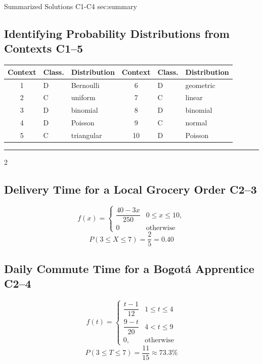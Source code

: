 	\sectionScored
	{Summarized Solutions}
	{C1-C4}
	{sec:summary}
	{
		\subsection{Identifying Probability Distributions from Contexts \hfill C1--5}
		\begin{center}
			\begin{tabular}{cll@{\qquad}cll}
				\toprule
				Context & Class. & Distribution & Context & Class. & Distribution \\
				\midrule
				1 & D & Bernoulli & 6 & D & geometric \\
				2 & C & uniform & 7 & C & linear \\
				3 & D & binomial & 8 & D & binomial \\
				4 & D & Poisson & 9 & C & normal \\
				5 & C & triangular & 10 & D & Poisson \\
				\bottomrule
			\end{tabular}
		\end{center}

		\setlength{\columnseprule}{0.4pt}
		\noindent\rule{\textwidth}{0.5pt}

		\begin{multicols}{2}
		\subsection{Delivery Time for a Local Grocery Order \hfill C2--3}
		\[
		f(x)=
		\begin{cases}
			\dfrac{40-3x}{250}&0\le x\le10,\\[1mm]
			0&\text{otherwise}
		\end{cases}
		\]\[
		\boxed{P(3\le X\le7)=\frac25=0.40}
		\]

		\subsection{Daily Commute Time for a Bogotá Apprentice \hfill C2--4}
		\[
		f(t)=
		\begin{cases}
			\dfrac{t-1}{12}&1\le t\le4\\[1mm]
			\dfrac{9-t}{20}&4<t\le9\\[1mm]
			0,&\text{otherwise}
		\end{cases}
		\]\[
		\boxed{P(3\le T\le7)=\frac{11}{15}\approx73.3\%}
		\]

		\end{multicols}

}
